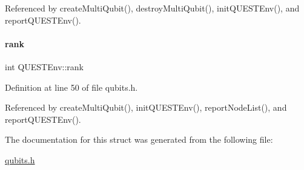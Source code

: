 Referenced by create\+Multi\+Qubit(), destroy\+Multi\+Qubit(), init\+Q\+U\+E\+S\+T\+Env(), and report\+Q\+U\+E\+S\+T\+Env().

\mbox{\label{structQUESTEnv_a1bdb6d425a2ce6a468f93929c0b26d73}} 
\paragraph{\texorpdfstring{rank}{rank}}
{\footnotesize\ttfamily int Q\+U\+E\+S\+T\+Env\+::rank}



Definition at line 50 of file qubits.\+h.



Referenced by create\+Multi\+Qubit(), init\+Q\+U\+E\+S\+T\+Env(), report\+Node\+List(), and report\+Q\+U\+E\+S\+T\+Env().



The documentation for this struct was generated from the following file\+:\begin{DoxyCompactItemize}
\item 
\hyperlink{qubits_8h}{qubits.\+h}\end{DoxyCompactItemize}

